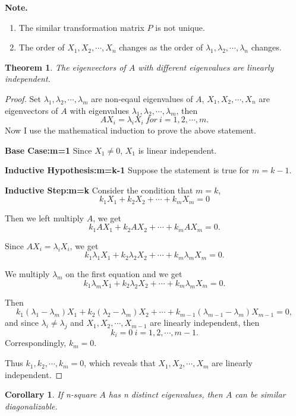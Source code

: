 \documentclass{article}
\newtheorem{theorem}{Theorem}[section]
\newtheorem{corollary}{Corollary}[theorem]
\theoremstyle{definition}
\begin{document}
\textbf{Note.}
\begin{enumerate}
\item The similar transformation matrix $P$ is not unique.
\item The order of $X_{1},X_{2},\cdots,X_{n}$ changes as the order of $\lambda_{1},\lambda_{2},\cdots,\lambda_{n}$ changes.
\end{enumerate}


\begin{theorem}
The eigenvectors of $A$ with different eigenvalues are linearly independent.
\end{theorem}

\begin{proof}
Set $\lambda_{1},\lambda_{2},\cdots,\lambda_{m}$ are non-eqaul eigenvalues of $A$, $X_{1},X_{2},\cdots,X_{n}$ 
are eigenvectors of $A$ with eigenvalues $\lambda_{1},\lambda_{2},\cdots,\lambda_{m}$, then 
$$ AX_{i}=\lambda_{i}X_{i}\ for\ i=1,2,\cdots,m.$$
Now I use the mathematical induction to prove the above statement.

\textbf{Base Case:m=1} Since $X_{1}\neq 0$, $X_{1}$ is linear independent.

\textbf{Inductive Hypothesis:m=k-1} Suppose the statement is true for $m=k-1$.

\textbf{Inductive Step:m=k} Consider the condition that $m=k$, 
$$k_{1}X_{1}+k_{2}X_{2}+\cdots+k_{m}X_{m}=0$$

Then we left multiply $A$, we get 
$$k_{1}AX_{1}+k_{2}AX_{2}+\cdots+k_{m}AX_{m}=0.$$

Since $AX_{i}=\lambda_{i}X_{i}$, we get 
$$k_{1}\lambda_{1}X_{1}+k_{2}\lambda_{2}X_{2}+\cdots+k_{m}\lambda_{m}X_{m}=0.$$

We multiply $\lambda_{m}$ on the first equation and we get 
$$k_{1}\lambda_{m}X_{1}+k_{2}\lambda_{2}X_{2}+\cdots+k_{m}\lambda_{m}X_{m}=0.$$

Then
$$k_{1}(\lambda_{1}-\lambda_{m})X_{1}+k_{2}(\lambda_{2}-\lambda_{m})X_{2}+\cdots+k_{m-1}(\lambda_{m-1}-\lambda_{m})X_{m-1}=0,$$
and since $\lambda_{i}\neq\lambda_{j}$ and $X_{1},X_{2},\cdots,X_{m-1}$ are linearly independent, 
then $$k_{i}=0\ i=1,2,\cdots,m-1.$$
Correspondingly, $k_{m}=0$.

Thus $k_{1},k_{2},\cdots,k_{m}=0$, which reveals that $X_{1},X_{2},\cdots,X_{m}$ are linearly independent.
\end{proof}

\begin{corollary}
    If n-square $A$ has n distinct eigenvalues, then $A$ can be similar diagonalizable.
\end{corollary}
\end{document}
